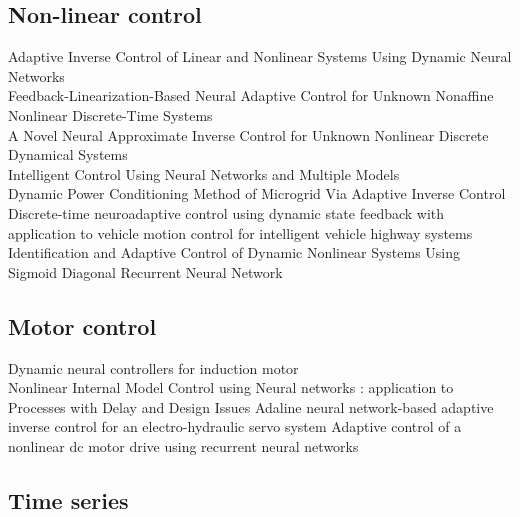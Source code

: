 \documentclass[conference]{IEEEtran}
\begin{document}
\subsection{Non-linear control}
Adaptive Inverse Control of Linear and Nonlinear Systems Using Dynamic Neural Networks \cite{plett2003adaptive} \\
Feedback-Linearization-Based Neural Adaptive Control for Unknown Nonaffine Nonlinear Discrete-Time Systems \cite{deng2008feedback}\\
A Novel Neural Approximate Inverse Control for Unknown Nonlinear Discrete Dynamical Systems \cite{deng2005a} \\
Intelligent Control Using Neural Networks and Multiple Models \cite{fu2008intelligent} \\
Dynamic Power Conditioning Method of Microgrid Via Adaptive Inverse Control \cite{li2015dynamic} \\
Discrete-time neuroadaptive control using dynamic state feedback with application to vehicle motion control for intelligent vehicle highway systems \cite{kumarawadu2010discrete-time} \\
Identification and Adaptive Control of Dynamic Nonlinear Systems Using Sigmoid Diagonal Recurrent Neural Network \cite{aboueldahab2011identification} \\

\subsection{Motor control}
Dynamic neural controllers for induction motor \cite{brdys1999dynamic} \\
Nonlinear Internal Model Control using Neural networks : application to Processes with Delay and Design Issues \cite{rivalsnonlinear}
Adaline neural network-based adaptive inverse control for an electro-hydraulic servo system \cite{yao2010adaline}
Adaptive control of a nonlinear dc motor drive using recurrent neural networks \cite{nouri2008adaptive}
\subsection{Time series}




\end{document}
